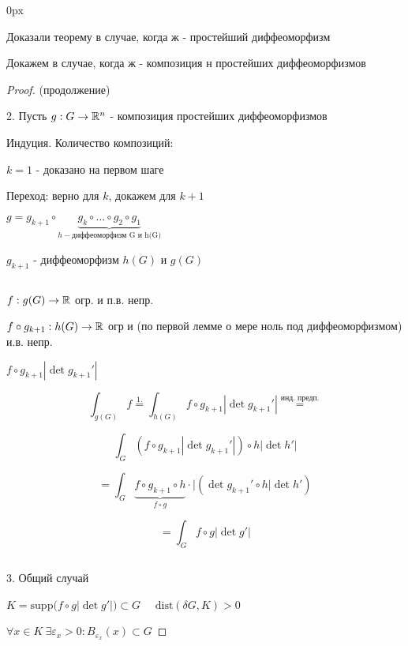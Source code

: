 
\parindent 0px

\usepackage{amsfonts, amssymb, amsmath, mathtools, amsthm}  %
\usepackage{mathrsfs}


\renewcommand{\baselinestretch}{1.3} 
\setcounter{lemma}{19}



    Доказали теорему в случае, когда ж - простейший диффеоморфизм 
    
    Докажем в случае, когда ж - композиция н простейших диффеоморфизмов
    
    \begin{proof} (продолжение)
        
        2. Пусть $g: G \to \mathbb{R}^n$ - композиция простейших диффеоморфизмов
        
        Индуция. Количество композиций: 
        
        $k=1$ - доказано на первом шаге

        Переход: верно для $k$, докажем для $k+1$

        $g = g_{k+1}\circ \underbrace{g_k \circ \dotsc \circ g_2 \circ g_1}_{h - \text{диффеоморфизм G и h(G)}}$

        $g_{k+1}$ - диффеоморфизм $h(G)$ и $g(G)$

        \par $ $

        $f: g(G) \to \mathbb{R} $ огр. и п.в. непр.

        $f\circ g_{k+1}:h(G) \to \mathbb{R}$ огр и (по первой лемме о мере ноль под диффеоморфизмом) и.в. непр.

        $f\circ g_{k+1} |\det g_{k+1}'|$

        $$\int_{g(G)} f \overset{1.}{=} \int_{h(G)} f \circ g_{k+1} | \det g_{k+1}'| \overset{\text{инд. предп.}}{=} $$

        $$\int_G (f\circ g_{k+1} | \det g_{k+1}'|) \circ h |\det h'|$$

        $$= \int_G \underbrace{f\circ g_{k+1}\circ h}_{f \circ g} \cdot | (\det g_{k+1}' \circ h |\det h')$$

        $$=\int_G f \circ g |\det g'|$$

        \par $ $

        3. Общий случай

        $K = \text{supp}\big(f\circ g | \det g'|\big) \subset G \quad $
        $\text{dist}(\delta G, K) > 0$

        $\forall x \in K \ \exists \varepsilon_x > 0: B_{\varepsilon_x}(x) \subset G$


\end{proof}
